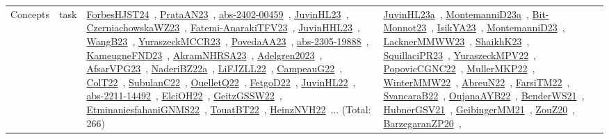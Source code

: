 {\begin{longtable}{lp{3cm}>{\raggedright\arraybackslash}p{6cm}>{\raggedright\arraybackslash}p{6cm}>{\raggedright\arraybackslash}p{8cm}}
Concepts & task & \href{works/ForbesHJST24.pdf}{ForbesHJST24}~\cite{ForbesHJST24}, \href{works/PrataAN23.pdf}{PrataAN23}~\cite{PrataAN23}, \href{works/abs-2402-00459.pdf}{abs-2402-00459}~\cite{abs-2402-00459}, \href{works/JuvinHL23.pdf}{JuvinHL23}~\cite{JuvinHL23}, \href{works/CzerniachowskaWZ23.pdf}{CzerniachowskaWZ23}~\cite{CzerniachowskaWZ23}, \href{works/Fatemi-AnarakiTFV23.pdf}{Fatemi-AnarakiTFV23}~\cite{Fatemi-AnarakiTFV23}, \href{works/JuvinHHL23.pdf}{JuvinHHL23}~\cite{JuvinHHL23}, \href{works/WangB23.pdf}{WangB23}~\cite{WangB23}, \href{works/YuraszeckMCCR23.pdf}{YuraszeckMCCR23}~\cite{YuraszeckMCCR23}, \href{works/PovedaAA23.pdf}{PovedaAA23}~\cite{PovedaAA23}, \href{works/abs-2305-19888.pdf}{abs-2305-19888}~\cite{abs-2305-19888}, \href{works/KameugneFND23.pdf}{KameugneFND23}~\cite{KameugneFND23}, \href{works/AkramNHRSA23.pdf}{AkramNHRSA23}~\cite{AkramNHRSA23}, \href{works/Adelgren2023.pdf}{Adelgren2023}~\cite{Adelgren2023}, \href{works/AfsarVPG23.pdf}{AfsarVPG23}~\cite{AfsarVPG23}, \href{works/NaderiBZ22a.pdf}{NaderiBZ22a}~\cite{NaderiBZ22a}, \href{works/LiFJZLL22.pdf}{LiFJZLL22}~\cite{LiFJZLL22}, \href{works/CampeauG22.pdf}{CampeauG22}~\cite{CampeauG22}, \href{works/ColT22.pdf}{ColT22}~\cite{ColT22}, \href{works/SubulanC22.pdf}{SubulanC22}~\cite{SubulanC22}, \href{works/OuelletQ22.pdf}{OuelletQ22}~\cite{OuelletQ22}, \href{works/FetgoD22.pdf}{FetgoD22}~\cite{FetgoD22}, \href{works/JuvinHL22.pdf}{JuvinHL22}~\cite{JuvinHL22}, \href{works/abs-2211-14492.pdf}{abs-2211-14492}~\cite{abs-2211-14492}, \href{works/ElciOH22.pdf}{ElciOH22}~\cite{ElciOH22}, \href{works/GeitzGSSW22.pdf}{GeitzGSSW22}~\cite{GeitzGSSW22}, \href{works/EtminaniesfahaniGNMS22.pdf}{EtminaniesfahaniGNMS22}~\cite{EtminaniesfahaniGNMS22}, \href{works/TouatBT22.pdf}{TouatBT22}~\cite{TouatBT22}, \href{works/HeinzNVH22.pdf}{HeinzNVH22}~\cite{HeinzNVH22}... (Total: 266) & \href{works/JuvinHL23a.pdf}{JuvinHL23a}~\cite{JuvinHL23a}, \href{works/MontemanniD23a.pdf}{MontemanniD23a}~\cite{MontemanniD23a}, \href{works/Bit-Monnot23.pdf}{Bit-Monnot23}~\cite{Bit-Monnot23}, \href{works/IsikYA23.pdf}{IsikYA23}~\cite{IsikYA23}, \href{works/MontemanniD23.pdf}{MontemanniD23}~\cite{MontemanniD23}, \href{works/LacknerMMWW23.pdf}{LacknerMMWW23}~\cite{LacknerMMWW23}, \href{works/ShaikhK23.pdf}{ShaikhK23}~\cite{ShaikhK23}, \href{works/SquillaciPR23.pdf}{SquillaciPR23}~\cite{SquillaciPR23}, \href{works/YuraszeckMPV22.pdf}{YuraszeckMPV22}~\cite{YuraszeckMPV22}, \href{works/PopovicCGNC22.pdf}{PopovicCGNC22}~\cite{PopovicCGNC22}, \href{works/MullerMKP22.pdf}{MullerMKP22}~\cite{MullerMKP22}, \href{works/WinterMMW22.pdf}{WinterMMW22}~\cite{WinterMMW22}, \href{works/AbreuN22.pdf}{AbreuN22}~\cite{AbreuN22}, \href{works/FarsiTM22.pdf}{FarsiTM22}~\cite{FarsiTM22}, \href{works/SvancaraB22.pdf}{SvancaraB22}~\cite{SvancaraB22}, \href{works/OujanaAYB22.pdf}{OujanaAYB22}~\cite{OujanaAYB22}, \href{works/BenderWS21.pdf}{BenderWS21}~\cite{BenderWS21}, \href{works/HubnerGSV21.pdf}{HubnerGSV21}~\cite{HubnerGSV21}, \href{works/GeibingerMM21.pdf}{GeibingerMM21}~\cite{GeibingerMM21}, \href{works/ZouZ20.pdf}{ZouZ20}~\cite{ZouZ20}, \href{works/BarzegaranZP20.pdf}{BarzegaranZP20}~\cite{BarzegaranZP20}, 
\end{longtable}}
